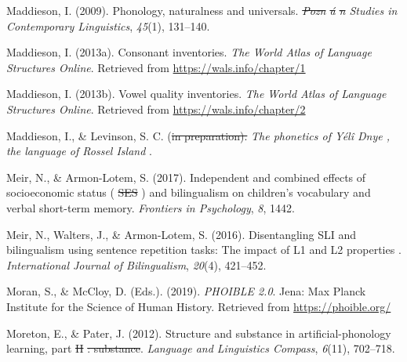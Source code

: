 \documentclass[english,,man,floatsintext]{apa6} %
\providecommand{\DIFaddtex}[1]{{\protect\color{blue}\uwave{#1}}} %
\providecommand{\DIFdeltex}[1]{{\protect\color{red}\sout{#1}}}                      %
\providecommand{\DIFaddbegin}{} %
\providecommand{\DIFaddend}{} %
\providecommand{\DIFdelbegin}{} %
\providecommand{\DIFdelend}{} %
\providecommand{\DIFadd}[1]{\texorpdfstring{\DIFaddtex{#1}}{#1}} %
\providecommand{\DIFdel}[1]{\texorpdfstring{\DIFdeltex{#1}}{}} %
\newcommand{\DIFscaledelfig}{0.5}
\newlength{\DIFdelgraphicswidth} %
\newlength{\DIFdelgraphicsheight} %
\newcommand{\DIFaddincludegraphics}[2][]{{\color{blue}\fbox{\DIFOincludegraphics[#1]{#2}}}} %
\newcommand{\DIFdelincludegraphics}[2][]{%
	\sbox{\DIFdelgraphicsbox}{\DIFOincludegraphics[#1]{#2}}%
	\settoboxwidth{\DIFdelgraphicswidth}{\DIFdelgraphicsbox} %
	\settoboxtotalheight{\DIFdelgraphicsheight}{\DIFdelgraphicsbox} %
	\scalebox{\DIFscaledelfig}{%
		\parbox[b]{\DIFdelgraphicswidth}{\usebox{\DIFdelgraphicsbox}\\[-\baselineskip] \rule{\DIFdelgraphicswidth}{0em}}\llap{\resizebox{\DIFdelgraphicswidth}{\DIFdelgraphicsheight}{%
				\setlength{\unitlength}{\DIFdelgraphicswidth}%
				\begin{picture}(1,1)%
				\thicklines\linethickness{2pt} %
				{\color[rgb]{1,0,0}\put(0,0){\framebox(1,1){}}}%
				{\color[rgb]{1,0,0}\put(0,0){\line( 1,1){1}}}%
				{\color[rgb]{1,0,0}\put(0,1){\line(1,-1){1}}}%
				\end{picture}%
			}\hspace*{3pt}}} %
} %
\DeclareRobustCommand{\DIFaddbegin}{\DIFOaddbegin \let\includegraphics\DIFaddincludegraphics} %
\DeclareRobustCommand{\DIFaddend}{\DIFOaddend \let\includegraphics\DIFOincludegraphics} %
\DeclareRobustCommand{\DIFdelbegin}{\DIFOdelbegin \let\includegraphics\DIFdelincludegraphics} %
\DeclareRobustCommand{\DIFdelend}{\DIFOaddend \let\includegraphics\DIFOincludegraphics} %
\begin{document}
\leavevmode\hypertarget{ref-maddieson2009phonology}{}%
Maddieson, I. (2009). Phonology, naturalness and universals. \emph{\DIFdelbegin \DIFdel{Pozn}%
	\DIFdel{á}%
	\DIFdel{n }\DIFdelend \DIFaddbegin \DIFadd{Poznán }\DIFaddend Studies in Contemporary Linguistics}, \emph{45}(1), 131--140.

\leavevmode\hypertarget{ref-maddieson2013consonant}{}%
Maddieson, I. (2013a). Consonant inventories. \emph{The World Atlas of Language Structures Online}. Retrieved from \url{https://wals.info/chapter/1}

\leavevmode\hypertarget{ref-maddieson2013vowel}{}%
Maddieson, I. (2013b). Vowel quality inventories. \emph{The World Atlas of Language Structures Online}. Retrieved from \url{https://wals.info/chapter/2}

\leavevmode\hypertarget{ref-maddiesonIPphoneticsYD}{}%
Maddieson, I., \& Levinson, S. C. (\DIFdelbegin \DIFdel{in preparation). }\DIFdelend \DIFaddbegin \DIFadd{n.d.). }\DIFaddend \emph{The phonetics of \DIFdelbegin %
	\DIFdelend Yélî Dnye\DIFdelbegin %
	\DIFdelend , the language of \DIFdelbegin %
	\DIFdelend Rossel Island\DIFdelbegin %
	\DIFdelend }.

\leavevmode\hypertarget{ref-meir2017independent}{}%
Meir, N., \& Armon-Lotem, S. (2017). Independent and combined effects of socioeconomic status (\DIFdelbegin %
\DIFdel{SES}%
\DIFdelend \DIFaddbegin \DIFadd{SES}\DIFaddend ) and bilingualism on children's vocabulary and verbal short-term memory. \emph{Frontiers in Psychology}, \emph{8}, 1442.

\leavevmode\hypertarget{ref-meir2016disentangling}{}%
Meir, N., Walters, J., \& Armon-Lotem, S. (2016). \DIFdelbegin %
\DIFdelend Disentangling SLI and bilingualism using sentence repetition tasks: The impact of L1 and L2 properties\DIFdelbegin %
\DIFdelend . \emph{International Journal of Bilingualism}, \emph{20}(4), 421--452.

\leavevmode\hypertarget{ref-phoible}{}%
Moran, S., \& McCloy, D. (Eds.). (2019). \emph{PHOIBLE 2.0}. Jena: Max Planck Institute for the Science of Human History. Retrieved from \url{https://phoible.org/}

\leavevmode\hypertarget{ref-moreton2012structure}{}%
Moreton, E., \& Pater, J. (2012). Structure and substance in artificial-phonology learning, part \DIFdelbegin %
\DIFdel{II}%
\DIFdel{: substance}\DIFdelend \DIFaddbegin \DIFadd{II: Substance}\DIFaddend . \emph{Language and Linguistics Compass}, \emph{6}(11), 702--718.
\end{document}
